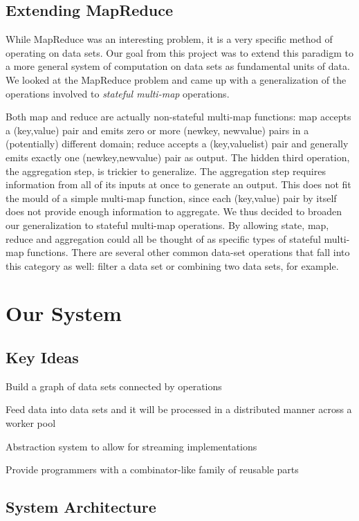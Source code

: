 \documentclass{article}
\begin{document}
\subsection{Extending MapReduce}

While MapReduce was an interesting problem, it is a very specific method of
operating on data sets. Our goal from this project was to extend this paradigm
to a more general system of computation on data sets as fundamental units of
data. We looked at the MapReduce problem and came up with a generalization
of the operations involved to \emph{stateful multi-map} operations.

Both map and reduce are actually non-stateful multi-map functions: map accepts a (key,value) pair
and emits zero or more (newkey, newvalue) pairs in a (potentially) different
domain; reduce accepts a (key,valuelist) pair and generally emits exactly
one (newkey,newvalue) pair as output. The hidden third operation, the aggregation
step, is trickier to generalize. The aggregation step requires information
from all of its inputs at once to generate an output. This does not fit the 
mould of a simple multi-map function, since each (key,value) pair by itself
does not provide enough information to aggregate. We thus decided to broaden our
generalization to stateful multi-map operations. By allowing state, map, reduce
and aggregation could all be thought of as specific types of stateful multi-map
functions. There are several other common data-set operations that fall into this category
as well: filter a data set or combining two data sets, for example.


\section{Our System}

\subsection{Key Ideas}

Build a graph of data sets connected by operations

Feed data into data sets and it will be processed in a distributed manner across a worker pool

Abstraction system to allow for streaming implementations

Provide programmers with a combinator-like family of reusable parts

\subsection{System Architecture}
\end{document}
